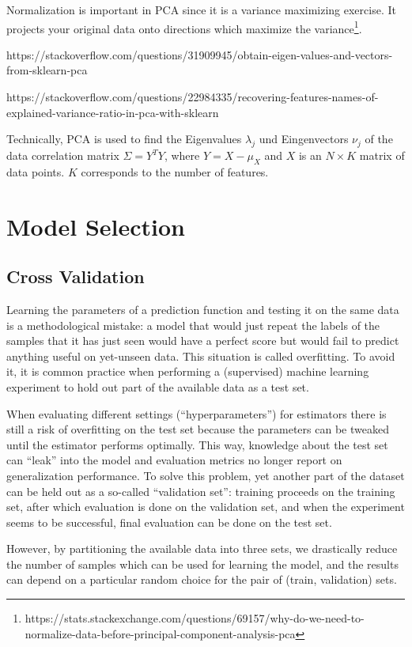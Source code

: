 \documentclass[11pt]{article}
\theoremstyle{plain}
\theoremstyle{definition}
\begin{document}
Normalization is important in PCA since it is a variance maximizing exercise. It projects your original data onto directions which maximize the variance\footnote{https://stats.stackexchange.com/questions/69157/why-do-we-need-to-normalize-data-before-principal-component-analysis-pca}. 

https://stackoverflow.com/questions/31909945/obtain-eigen-values-and-vectors-from-sklearn-pca

https://stackoverflow.com/questions/22984335/recovering-features-names-of-explained-variance-ratio-in-pca-with-sklearn

Technically, PCA is used to find the Eigenvalues $\lambda_j$ und Eingenvectors $\nu_j$ of the data correlation matrix $\Sigma = Y^T Y$, where $Y = X - \mu_X$ and $X$ is an $N \times K$ matrix of data points. $K$ corresponds to the number of features.


\section{Model Selection}

\subsection{Cross Validation}
Learning the parameters of a prediction function and testing it on the same data is a methodological mistake: a model that would just repeat the labels of the samples that it has just seen would have a perfect score but would fail to predict anything useful on yet-unseen data. This situation is called overfitting. To avoid it, it is common practice when performing a (supervised) machine learning experiment to hold out part of the available data as a test set.

When evaluating different settings (“hyperparameters”) for estimators there is still a risk of overfitting on the test set because the parameters can be tweaked until the estimator performs optimally. This way, knowledge about the test set can “leak” into the model and evaluation metrics no longer report on generalization performance. To solve this problem, yet another part of the dataset can be held out as a so-called “validation set”: training proceeds on the training set, after which evaluation is done on the validation set, and when the experiment seems to be successful, final evaluation can be done on the test set.

However, by partitioning the available data into three sets, we drastically reduce the number of samples which can be used for learning the model, and the results can depend on a particular random choice for the pair of (train, validation) sets.
\end{document}
